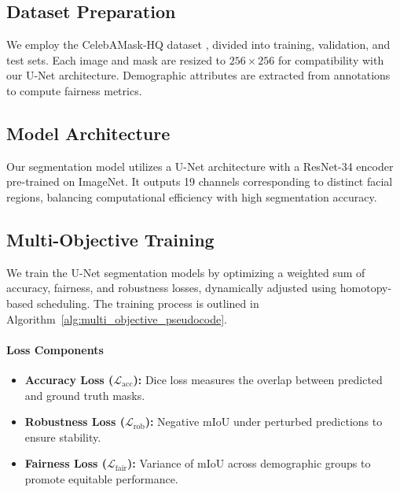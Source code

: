 \subsection{Dataset Preparation}
\label{subsec:dataset_preparation}

We employ the CelebAMask-HQ dataset \cite{CelebAMask-HQ}, divided into training, validation, and test sets. Each image and mask are resized to \(256 \times 256\) for compatibility with our U-Net architecture. Demographic attributes are extracted from annotations to compute fairness metrics.

\subsection{Model Architecture}
\label{subsec:model_architecture}

Our segmentation model utilizes a U-Net architecture with a ResNet-34 encoder pre-trained on ImageNet. It outputs 19 channels corresponding to distinct facial regions, balancing computational efficiency with high segmentation accuracy.

\subsection{Multi-Objective Training}
\label{subsec:multi_objective}

We train the U-Net segmentation models by optimizing a weighted sum of accuracy, fairness, and robustness losses, dynamically adjusted using homotopy-based scheduling. The training process is outlined in Algorithm~\ref{alg:multi_objective_pseudocode}.

\paragraph{Loss Components}
\begin{itemize}
    \item \textbf{Accuracy Loss (\(\mathcal{L}_{\mathrm{acc}}\)):} Dice loss measures the overlap between predicted and ground truth masks.
    \item \textbf{Robustness Loss (\(\mathcal{L}_{\mathrm{rob}}\)):} Negative \(\mathrm{mIoU}\) under perturbed predictions to ensure stability.
    \item \textbf{Fairness Loss (\(\mathcal{L}_{\mathrm{fair}}\)):} Variance of \(\mathrm{mIoU}\) across demographic groups to promote equitable performance.
\end{itemize}

